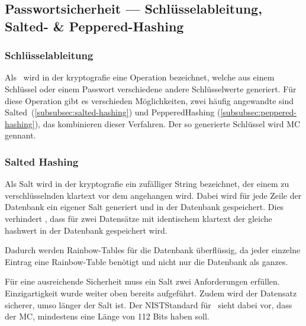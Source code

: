 \subsection[Passwortsicherheit]{Passwortsicherheit — Schlüsselableitung, Salted- \& Peppered-Hashing}\label{subsec:passwortsicherheit}

\subsubsection{Schlüsselableitung}\label{subsubsec:key-derivation-function}
Als~ wird in der \gls{kryptografie} eine Operation bezeichnet, welche aus einem Schlüssel oder einem Passwort verschiedene andere Schlüsselwerte generiert.\autocite[\vglf][]{NIST:800132}
Für diese Operation gibt es verschieden Möglichkeiten, zwei häufig angewandte sind Salted\nonbreakdash\ (\autoref{subsubsec:salted-hashing}) und Peppered\nonbreakdash Hashing (\autoref{subsubsec:peppered-hashing}), \bzw das kombinieren dieser Verfahren.
Der so generierte Schlüssel wird \ac{MC} gennant.

\subsubsection{Salted Hashing}\label{subsubsec:salted-hashing}
Als Salt wird in der \gls{kryptografie} ein zufälliger String bezeichnet, der einem zu verschlüsselnden \gls{klartext} vor dem  angehangen wird\autocite[\vglf][]{JoyOfCryptography:2021}.
Dabei wird für jede Zeile der Datenbank ein eigener Salt generiert und in der Datenbank gespeichert.
Dies verhindert \uaol, dass für zwei Datensätze mit identischem \gls{klartext} der gleiche \gls{hashwert} in der Datenbank gespeichert wird.

Dadurch werden \glspl{Rainbow-Table} für die Datenbank überflüssig, da jeder einzelne Eintrag eine \gls{Rainbow-Table} benötigt und nicht nur die Datenbank als ganzes.~\autocite[\vglf][]{JoyOfCryptography:2021}

Für eine ausreichende Sicherheit muss ein Salt zwei Anforderungen erfüllen.
Einzigartigkeit wurde weiter oben bereits aufgeführt.
Zudem wird der Datensatz sicherer, umso länger der Salt ist.
Der \ac{NIST}\nonbreakdash Standard für\  sieht dabei vor, dass der \ac{MC}, mindestens eine Länge von 112 Bits haben soll.\autocite[\vglf][]{NIST:800132}

